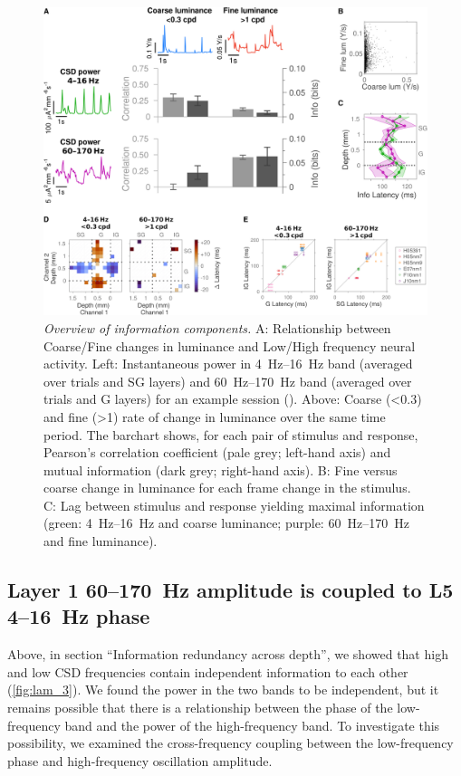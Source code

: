 \begin{figure}[htbp]
\centering \includegraphics[width=\columnwidth]{paperfigs/fig6}
%
\caption{%
\textit{Overview of information components.}
A: Relationship between Coarse/Fine changes in luminance and Low/High frequency neural activity.
Left: Instantaneous power in \SIrange{4}{16}{Hz} band (averaged over trials and \ac{SG} layers) and \SIrange{60}{170}{Hz} band (averaged over trials and \ac{G} layers) for an example session ().
Above: Coarse (\SI{<0.3}{\cpd}) and fine (\SI{>1}{\cpd}) rate of change in luminance over the same time period.
The barchart shows, for each pair of stimulus and response, Pearson's correlation coefficient (pale grey; left-hand axis) and mutual information (dark grey; right-hand axis).
B: Fine versus coarse change in luminance for each frame change in the stimulus.
C: Lag between stimulus and response yielding maximal information (green: \SIrange{4}{16}{Hz} and coarse luminance; purple: \SIrange{60}{170}{Hz} and fine luminance).}%
\label{fig:lam_6}
%
\end{figure}


\subsection{Layer 1 60--\SI{170}{Hz} amplitude is coupled to L5 4--\SI{16}{Hz} phase}

Above, in section ``Information redundancy across depth'', we showed that high and low \ac{CSD} frequencies contain independent information to each other (\autoref{fig:lam_3}).
We found the power in the two bands to be independent, but it remains possible that there is a relationship between the phase of the low-frequency band and the power of the high-frequency band.
To investigate this possibility, we examined the cross-frequency coupling between the low-frequency phase and high-frequency oscillation amplitude.


